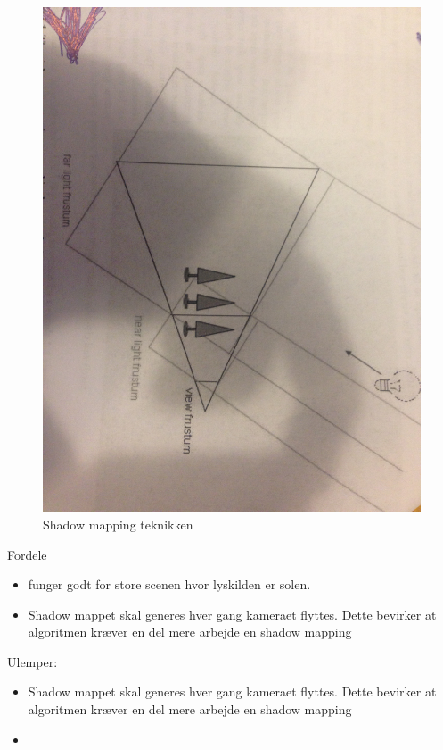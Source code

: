 \documentclass[11pt,a4paper]{article}
\begin{document}
\begin{figure}[ht!]
\centering
\includegraphics[width=140mm]{img/CSSHMAP1.JPG}
\caption{Shadow mapping teknikken}
\label{shadowmapdesc}
\end{figure}

Fordele
\begin{itemize}
  \item funger godt for store scenen hvor lyskilden er solen.
  \item Shadow mappet skal generes  hver gang kameraet flyttes. Dette bevirker at algoritmen kræver en del mere arbejde en shadow mapping
\end{itemize}

Ulemper:
\begin{itemize}
  \item Shadow mappet skal generes  hver gang kameraet flyttes. Dette bevirker at algoritmen kræver en del mere arbejde en shadow mapping
  \item
\end{itemize}
\end{document}
